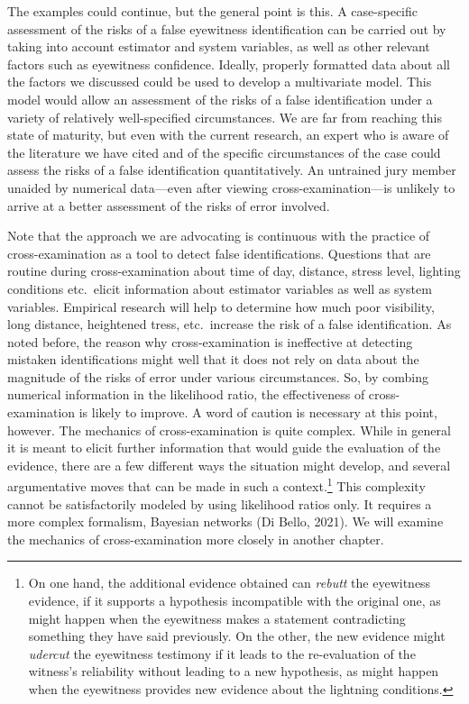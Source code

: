 \documentclass[
  10pt,
  dvipsnames,enabledeprecatedfontcommands]{scrartcl}
\begin{document}
\vspace{1mm}
\footnotesize

\normalsize

The examples could continue, but the general point is this. A
case-specific assessment of the risks of a false eyewitness
identification can be carried out by taking into account estimator and
system variables, as well as other relevant factors such as eyewitness
confidence. Ideally, properly formatted data about all the factors we
discussed could be used to develop a multivariate model. This model
would allow an assessment of the risks of a false identification under a
variety of relatively well-specified circumstances. We are far from
reaching this state of maturity, but even with the current research, an
expert who is aware of the literature we have cited and of the specific
circumstances of the case could assess the risks of a false
identification quantitatively. An untrained jury member unaided by
numerical data---even after viewing cross-examination---is unlikely to
arrive at a better assessment of the risks of error involved.

Note that the approach we are advocating is continuous with the practice
of cross-examination as a tool to detect false identifications.
Questions that are routine during cross-examination about time of day,
distance, stress level, lighting conditions etc.~elicit information
about estimator variables as well as system variables. Empirical
research will help to determine how much poor visibility, long distance,
heightened tress, etc.~increase the risk of a false identification. As
noted before, the reason why cross-examination is ineffective at
detecting mistaken identifications might well that it does not rely on
data about the magnitude of the risks of error under various
circumstances. So, by combing numerical information in the likelihood
ratio, the effectiveness of cross-examination is likely to improve. A
word of caution is necessary at this point, however. The mechanics of
cross-examination is quite complex. While in general it is meant to
elicit further information that would guide the evaluation of the
evidence, there are a few different ways the situation might develop,
and several argumentative moves that can be made in such a
context.\footnote{On one hand, the additional evidence obtained can
  \textit{rebutt} the eyewitness evidence, if it supports a hypothesis
  incompatible with the original one, as might happen when the
  eyewitness makes a statement contradicting something they have said
  previously. On the other, the new evidence might \textit{udercut} the
  eyewitness testimony if it leads to the re-evaluation of the witness's
  reliability without leading to a new hypothesis, as might happen when
  the eyewitness provides new evidence about the lightning conditions.}
This complexity cannot be satisfactorily modeled by using likelihood
ratios only. It requires a more complex formalism, Bayesian networks (Di
Bello, 2021). We will examine the mechanics of cross-examination more
closely in another chapter.
\end{document}
